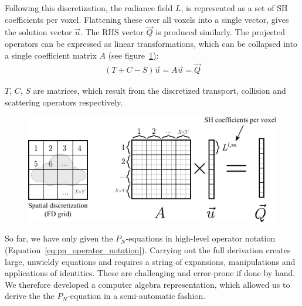Following this discretization, the radiance field $L$, is represented as a set of SH coefficients per voxel. Flattening these over all voxels into a single vector, gives the solution vector $\vec{u}$. The RHS vector $\vec{Q}$ is produced similarly. The projected operators can be expressed as linear transformations, which can be collapsed into a single coefficient matrix $A$ (see figure~\ref{fig:matrix_layout}):
\begin{align}
(T+C-S)\vec{u} = A\vec{u} = \vec{Q}
\end{align}

$T$, $C$, $S$ are matrices, which result from the discretized transport, collision and scattering operators respectively.

\begin{figure}[h]
\centering
\includegraphics[width=\columnwidth]{figures/fig_matrix_layout.pdf}
\vspace{-0.2in}
\label{fig:matrix_layout}
\end{figure}

So far, we have only given the $P_N$-equations in high-level operator notation (Equation~\ref{eq:pn_operator_notation}). Carrying out the full derivation creates large, unwieldy equations and requires a string of expansions, manipulations and applications of identities. These are challenging and error-prone if done by hand. We therefore developed a computer algebra representation, which allowed us to derive the the $P_N$-equation in a semi-automatic fashion.


